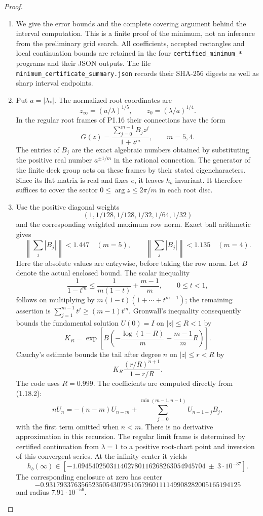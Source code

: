\documentclass[11pt,a4paper]{article}
\theoremstyle{definition}
\begin{document}
\begin{proof}
\begin{enumerate}[label=\arabic*.]
\item We give the error bounds and the complete covering argument behind
the interval computation.  This is a finite proof of the minimum,
not an inference from the preliminary grid search.  All coefficients,
accepted rectangles and local continuation bounds are retained in the
four \texttt{certified\_minimum\_*} programs and their JSON outputs.
The file \texttt{minimum\_certificate\_summary.json} records their
SHA-256 digests as well as sharp interval endpoints.

\item Put $a=|\lambda_*|$.  The normalized root coordinates are
\[
 z_\infty=(a/\lambda)^{1/5},\qquad
 z_0=(\lambda/a)^{1/4}.
\]
In the regular root frames of P1.16 their connections have the form
\[
 G(z)=\frac{\sum_{j=0}^{m-1}B_jz^j}{1+z^m},\qquad m=5,4.
\tag{1.18.2}
\]
The entries of $B_j$ are the exact algebraic numbers obtained by
substituting the positive real number $a^{\pm1/m}$ in the rational
connection.  The generator of the finite deck group acts on these
frames by their stated eigencharacters.  Since its flat matrix is
real and fixes $e$, it leaves $h_b$ invariant.  It therefore suffices
to cover the sector $0\leq\arg z\leq2\pi/m$ in each root disc.

\item Use the positive diagonal weights
\[
 (1,1/128,1/128,1/32,1/64,1/32)
\]
and the corresponding weighted maximum row norm.  Exact ball
arithmetic gives
\[
 \left\|\sum_j |B_j|\right\|<1.447\quad(m=5),\qquad
 \left\|\sum_j |B_j|\right\|<1.135\quad(m=4).
\]
Here the absolute values are entrywise, before taking the row norm.
Let $B$ denote the actual enclosed bound.  The scalar inequality
\[
 \frac1{1-t^m}\leq\frac1{m(1-t)}+\frac{m-1}{m},\qquad0\leq t<1,
\]
follows on multiplying by $m(1-t)(1+\cdots+t^{m-1})$;
the remaining assertion is
$\sum_{j=1}^{m-1}t^j\geq(m-1)t^m$.
Gronwall's inequality consequently bounds the fundamental solution
$U(0)=I$ on $|z|\leq R<1$ by
\[
 K_R=\exp\!\left[B\left(-\frac{\log(1-R)}m
                    +\frac{m-1}{m}R\right)\right].
\]
Cauchy's estimate bounds the tail after degree $n$ on $|z|\leq r<R$
by
\[
 K_R\frac{(r/R)^{n+1}}{1-r/R}.
\tag{1.18.3}
\]
The code uses $R=0.999$.  The coefficients are computed directly
from (1.18.2):
\[
 nU_n=-(n-m)U_{n-m}
       +\sum_{j=0}^{\min(m-1,n-1)}U_{n-1-j}B_j,
\]
with the first term omitted when $n<m$.
There is no derivative approximation in this recursion.
The regular limit frame is determined by certified continuation
from $\lambda=1$ to a positive root-chart point and inversion of
this convergent series.  At the infinity center it yields
\[
 h_b(\infty)\in
 [-1.094540250311402780116268263054945704
       \ \mathbin{\pm}\ 3\cdot10^{-37}].
\tag{1.18.4}
\]
The corresponding enclosure at zero has center
\[
-0.9317933763565235054307951057960111149908282005165194125
\]
and radius $7.91\cdot10^{-56}$.


\end{enumerate}
\end{proof}
\end{document}
